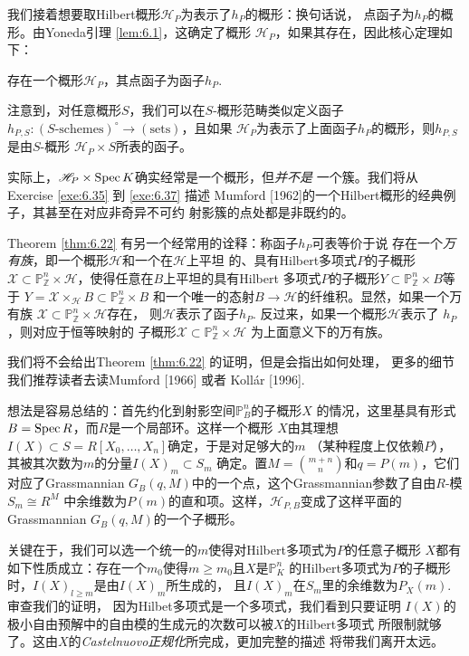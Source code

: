 我们接着想要取Hilbert概形$\mathscr H_P$为表示了$h_P$的概形：换句话说，
点函子为$h_P$的概形。由Yoneda引理 \eqref{lem:6.1}，这确定了概形
$\mathscr H_P$，如果其存在，因此核心定理如下：


\begin{thm}\label{thm:6.22}
存在一个概形$\mathscr H_P$，其点函子为函子$h_P$.
\end{thm}

注意到，对任意概形$S$，我们可以在$S$-概形范畴类似定义函子
$h_{P,S}:(\text{$S$-schemes})^\circ \to (\text{sets})$，且如果
$\mathscr H_P$为表示了上面函子$h_P$的概形，则$h_{P,S}$是由$S$-概形
$\mathscr H_P\times S$所表的函子。

实际上，$\mathscr H_P\times \operatorname{Spec} K$确实经常是一个概形，但\emph{并不是}
一个簇。我们将从 Exercise \ref{exe:6.35} 到 \ref{exe:6.37} 描述
Mumford [1962]的一个Hilbert概形的经典例子，其甚至在对应非奇异不可约
射影簇的点处都是非既约的。

Theorem \ref{thm:6.22} 有另一个经常用的诠释：称函子$h_P$可表等价于说
存在一个\emph{万有族}，即一个概形$\mathscr H$和一个在$\mathscr H$上平坦
的、具有Hilbert多项式$P$的子概形$\mathscr X\subset \mathbb 
P_{\mathbb Z}^n\times \mathscr H$，使得任意在$B$上平坦的具有Hilbert
多项式$P$的子概形$Y\subset \mathbb P_{\mathbb Z}^n\times B$等于
$Y=\mathscr X\times_{\mathscr H}B\subset \mathbb P_{\mathbb Z}^n\times B$
和一个唯一的态射$B\to \mathscr H$的纤维积。显然，如果一个万有族
$\mathscr X\subset \mathbb P_{\mathbb Z}^n\times \mathscr H$存在，
则$\mathscr H$表示了函子$h_P$. 反过来，如果一个概形$\mathscr H$表示了
$h_P$，则对应于恒等映射的
子概形$\mathscr X\subset \mathbb P_{\mathbb Z}^n \times \mathscr H$
为上面意义下的万有族。

我们将不会给出Theorem \ref{thm:6.22} 的证明，但是会指出如何处理，
更多的细节我们推荐读者去读Mumford [1966] 或者 Koll\'ar [1996].

想法是容易总结的：首先约化到射影空间$\mathbb P_B^n$的子概形$X$
的情况，这里基具有形式$B=\operatorname{Spec} R$，而$R$是一个局部环。这样一个概形
$X$由其理想$I(X)\subset S=R[X_0,\dots,X_n]$确定，于是对足够大的$m$
（某种程度上仅依赖$P$），其被其次数为$m$的分量$I(X)_m\subset S_m$
确定。置$M={{m+n}\choose n}$和$q=P(m)$，它们对应了Grassmannian
$G_B(q,M)$中的一个点，这个Grassmannian参数了自由$R$-模$S_m\cong R^M$
中余维数为$P(m)$的直和项。这样，$\mathscr H_{P,B}$变成了这样平面的
Grassmannian $G_B(q,M)$的一个子概形。

关键在于，我们可以选一个统一的$m$使得对Hilbert多项式为$P$的任意子概形
$X$都有如下性质成立：存在一个$m_0$使得$m\geq m_0$且$X$是$\mathbb P_K^n$
的Hilbert多项式为$P$的子概形时，$I(X)_{l\geq m}$是由$I(X)_m$所生成的，
且$I(X)_m$在$S_m$里的余维数为$P_X(m)$. 审查我们的证明，
因为Hilbet多项式是一个多项式，我们看到只要证明
$I(X)$的极小自由预解中的自由模的生成元的次数可以被$X$的Hilbert多项式
所限制就够了。这由$X$的\emph{Castelnuovo正规化}所完成，更加完整的描述
将带我们离开太远。

